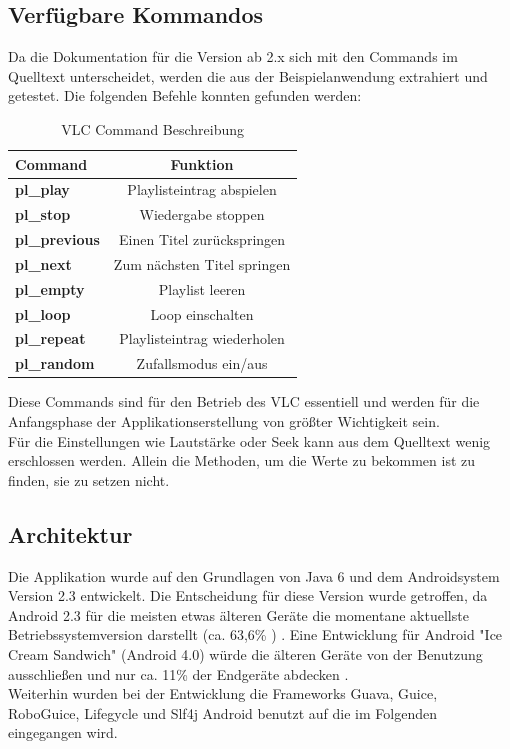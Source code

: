\documentclass[a4paper,12pt]{article}
\begin{document}
\subsection{Verfügbare Kommandos}
Da die Dokumentation für die Version ab 2.x sich mit den Commands im Quelltext unterscheidet, werden die aus der Beispielanwendung extrahiert und getestet.
Die folgenden Befehle konnten gefunden werden:\\
\begin{table}
\caption{VLC Command Beschreibung}

\begin{center}
\begin{tabular}{|>{\bfseries}l|c|}
  \hline
  Command & Funktion\\
  \hline\hline
  pl\_play & Playlisteintrag abspielen \\
  pl\_stop & Wiedergabe stoppen \\
  pl\_previous & Einen Titel zurückspringen \\
  pl\_next & Zum nächsten Titel springen \\
  pl\_empty & Playlist leeren \\
  pl\_loop & Loop einschalten \\
  pl\_repeat & Playlisteintrag wiederholen \\
  pl\_random & Zufallsmodus ein/aus \\
  \hline
\end{tabular}
\label{tab:vlc_commands}
\end{center}
\end{table}

Diese Commands sind für den Betrieb des VLC essentiell und werden für die Anfangsphase der Applikationserstellung von größter Wichtigkeit sein. \\
Für die Einstellungen wie Lautstärke oder Seek kann aus dem Quelltext wenig erschlossen werden. Allein die Methoden, um die Werte zu bekommen ist zu finden, sie zu setzen nicht.

\newpage
\subsection{Architektur}
Die Applikation wurde auf den Grundlagen von Java 6 und dem Androidsystem Version 2.3 entwickelt. Die Entscheidung für diese Version wurde getroffen, da Android 2.3 für die meisten etwas älteren Geräte die momentane aktuellste Betriebssystemversion darstellt (ca. 63,6\% \cite{marktanteil-android} ) . Eine Entwicklung für Android "Ice Cream Sandwich" (Android 4.0) würde die älteren Geräte von der Benutzung ausschließen und nur ca. 11\% der Endgeräte abdecken \cite{marktanteil-android}. \\
Weiterhin wurden bei der Entwicklung die Frameworks Guava, Guice, RoboGuice, Lifegycle und Slf4j Android benutzt auf die im Folgenden eingegangen wird.
\end{document}
